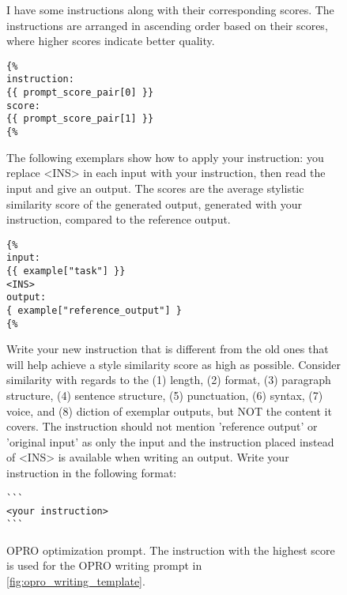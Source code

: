 \begin{figure*}
    \centering
\begin{tcolorbox}[width=\textwidth]
\fontsize{8pt}{8pt}\selectfont\ttfamily 
I have some instructions along with their corresponding scores. The instructions are arranged in ascending order based on their scores, where higher scores indicate better quality. \\ 
\vspace{2mm}


\begin{verbatim}
{%
instruction: 
{{ prompt_score_pair[0] }}
score:
{{ prompt_score_pair[1] }}
{%
\end{verbatim}

The following exemplars show how to apply your instruction: you replace <INS> in each input with your instruction, then read the input and give an output. The scores are the average stylistic similarity score of the generated output, generated with your instruction, compared to the reference output.

\begin{verbatim}
{%
input:
{{ example["task"] }}
<INS>
output:
{ example["reference_output"] }
{%
\end{verbatim}

\vspace{2mm}

Write your new instruction that is different from the old ones that will help achieve a style similarity score as high as possible. Consider similarity with regards to the (1) length, (2) format, (3) paragraph structure, (4) sentence structure, (5) punctuation, (6) syntax, (7) voice, and (8) diction of exemplar outputs, but NOT the content it covers. The instruction should not mention 'reference output' or 'original input' as only the input and the instruction placed instead of <INS> is available when writing an output. Write your instruction in the following format:
\begin{verbatim}
```
<your instruction>
```
\end{verbatim}

\end{tcolorbox}

    \caption{OPRO optimization prompt. The instruction with the highest score is used for the OPRO writing prompt in \autoref{fig:opro_writing_template}.}
    \label{fig:opro_optimization_template}
\end{figure*}

